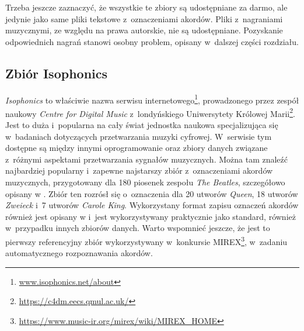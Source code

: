 \begin{table}
    \centering
    \caption{Fragment indeksu zbioru danych po pierwszym etapie jego tworzenia.}
    \label{tab:indeks_01}
\end{table}

Trzeba jeszcze zaznaczyć, że wszystkie te zbiory są udostępniane za darmo, ale jedynie jako same pliki tekstowe z~oznaczeniami akordów. Pliki z~nagraniami muzycznymi, ze względu na prawa autorskie, nie są udostępniane. Pozyskanie odpowiednich nagrań stanowi osobny problem, opisany w~dalszej części rozdziału.

\subsection{Zbiór Isophonics}

\emph{Isophonics} to właściwie nazwa serwisu internetowego\footnote{\url{www.isophonics.net/about}}, prowadzonego przez zespół naukowy \emph{Centre for Digital Music} z~londyńskiego Uniwersytety Królowej Marii\footnote{\url{https://c4dm.eecs.qmul.ac.uk/}}. Jest to duża i~popularna na cały świat jednostka naukowa specjalizująca się w~badaniach dotyczących przetwarzania muzyki cyfrowej. W~serwisie tym dostępne są między innymi oprogramowanie oraz zbiory danych związane z~różnymi aspektami przetwarzania sygnałów muzycznych.  Można tam znaleźć najbardziej popularny i~zapewne najstarszy zbiór z~oznaczeniami akordów muzycznych, przygotowany dla 180 piosenek zespołu \emph{The Beatles}, szczegółowo opisany w \cite{harte_towards_nodate}. Zbiór ten rozrósł się o~oznaczenia dla 20 utworów \emph{Queen}, 18 utworów \emph{Zweieck} i~7 utworów \emph{Carole King}. Wykorzystany format zapisu oznaczeń akordów również jest opisany w \cite{harte_towards_nodate} i~jest wykorzystywany praktycznie jako standard, również w~przypadku innych zbiorów danych. Warto wspomnieć jeszcze, że jest to pierwszy referencyjny zbiór wykorzystywany w~konkursie MIREX\footnote{\url{https://www.music-ir.org/mirex/wiki/MIREX_HOME}}, w~zadaniu automatycznego rozpoznawania akordów.

